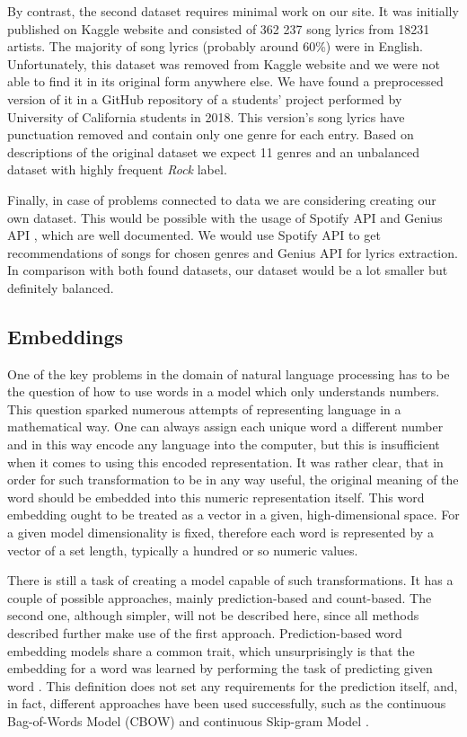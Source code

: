 By contrast, the second dataset requires minimal work on our site. It was initially published on Kaggle website and consisted of 362 237 song lyrics from 18231 artists. The majority of song lyrics (probably around 60\%) were in English. Unfortunately, this dataset was removed from Kaggle website and we were not able to find it in its original form anywhere else. We have found a preprocessed version of it in a GitHub repository of a students' project performed by University of California students in 2018. This version's song lyrics have punctuation removed and contain only one genre for each entry. Based on descriptions of the original dataset we expect 11 genres and an unbalanced dataset with highly frequent \textit{Rock} label.

Finally, in case of problems connected to data we are considering creating our own dataset. This would be possible with the usage of Spotify API \cite{Spotify} and Genius API \cite{Genius}, which are well documented. We would use Spotify API to get recommendations of songs for chosen genres and Genius API for lyrics extraction. In comparison with both found datasets, our dataset would be a lot smaller but definitely balanced.

\subsection{Embeddings}

One of the key problems in the domain of natural language processing has to be the question of how to use words in a model which only understands numbers. This question sparked numerous attempts of representing language in a mathematical way. One can always assign each unique word a different number and in this way encode any language into the computer, but this is insufficient when it comes to using this encoded representation. It was rather clear, that in order for such transformation to be in any way useful, the original meaning of the word should be embedded into this numeric representation itself. This word embedding ought to be treated as a vector in a given, high-dimensional space. For a given model dimensionality is fixed, therefore each word is represented by a vector of a set length, typically a hundred or so numeric values.

There is still a task of creating a model capable of such transformations. It has a couple of possible approaches, mainly prediction-based and count-based. The second one, although simpler, will not be described here, since all methods described further make use of the first approach. Prediction-based word embedding models share a common trait, which unsurprisingly is that the embedding for a word was learned by performing the task of predicting given word \cite{baroni}. This definition does not set any requirements for the prediction itself, and, in fact, different approaches have been used successfully, such as the continuous Bag-of-Words Model (CBOW) and  continuous Skip-gram Model \cite{mikolov2013}.

